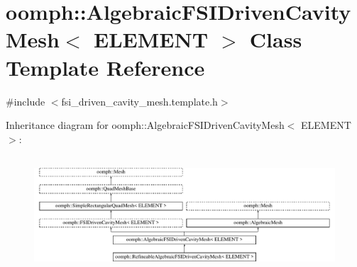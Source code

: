\hypertarget{classoomph_1_1AlgebraicFSIDrivenCavityMesh}{}\section{oomph\+:\+:Algebraic\+F\+S\+I\+Driven\+Cavity\+Mesh$<$ E\+L\+E\+M\+E\+NT $>$ Class Template Reference}
\label{classoomph_1_1AlgebraicFSIDrivenCavityMesh}


{\ttfamily \#include $<$fsi\+\_\+driven\+\_\+cavity\+\_\+mesh.\+template.\+h$>$}

Inheritance diagram for oomph\+:\+:Algebraic\+F\+S\+I\+Driven\+Cavity\+Mesh$<$ E\+L\+E\+M\+E\+NT $>$\+:\begin{figure}[H]
\begin{center}
\leavevmode
\includegraphics[height=4.375000cm]{classoomph_1_1AlgebraicFSIDrivenCavityMesh}
\end{center}
\end{figure}
